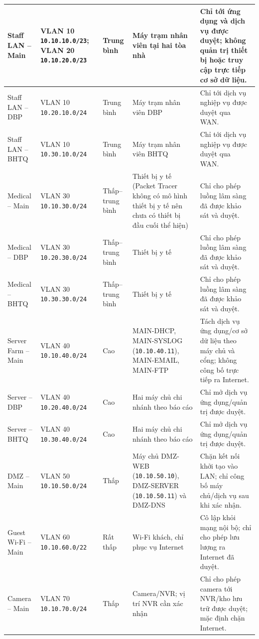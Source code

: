 \begin{small}
\begin{longtable}{|p{2.2cm}|p{3.8cm}|p{1.5cm}|p{3.4cm}|p{3.3cm}|}
Staff LAN -- Main & VLAN 10 \texttt{10.10.10.0/23}; VLAN 20 \texttt{10.10.20.0/23} & Trung bình & Máy trạm nhân viên tại hai tòa nhà & Chỉ tới ứng dụng và dịch vụ được duyệt; không quản trị thiết bị hoặc truy cập trực tiếp cơ sở dữ liệu. \\ \hline
Staff LAN -- DBP & VLAN 10 \texttt{10.20.10.0/24} & Trung bình & Máy trạm nhân viên DBP & Chỉ tới dịch vụ nghiệp vụ được duyệt qua WAN. \\ \hline
Staff LAN -- BHTQ & VLAN 10 \texttt{10.30.10.0/24} & Trung bình & Máy trạm nhân viên BHTQ & Chỉ tới dịch vụ nghiệp vụ được duyệt qua WAN. \\ \hline
Medical -- Main & VLAN 30 \texttt{10.10.30.0/24} & Thấp--trung bình & Thiết bị y tế (Packet Tracer không có mô hình thiết bị y tế nên chưa có thiết bị đầu cuối thể hiện) & Chỉ cho phép luồng lâm sàng đã được khảo sát và duyệt. \\ \hline
Medical -- DBP & VLAN 30 \texttt{10.20.30.0/24} & Thấp--trung bình & Thiết bị y tế & Chỉ cho phép luồng lâm sàng đã được khảo sát và duyệt. \\ \hline
Medical -- BHTQ & VLAN 30 \texttt{10.30.30.0/24} & Thấp--trung bình & Thiết bị y tế & Chỉ cho phép luồng lâm sàng đã được khảo sát và duyệt. \\ \hline
Server Farm -- Main & VLAN 40 \texttt{10.10.40.0/24} & Cao & MAIN-DHCP, MAIN-SYSLOG (\texttt{10.10.40.11}), MAIN-EMAIL, MAIN-FTP & Tách dịch vụ ứng dụng/cơ sở dữ liệu theo máy chủ và cổng; không công bố trực tiếp ra Internet. \\ \hline
Server -- DBP & VLAN 40 \texttt{10.20.40.0/24} & Cao & Hai máy chủ chi nhánh theo báo cáo & Chỉ mở dịch vụ ứng dụng/quản trị được duyệt. \\ \hline
Server -- BHTQ & VLAN 40 \texttt{10.30.40.0/24} & Cao & Hai máy chủ chi nhánh theo báo cáo & Chỉ mở dịch vụ ứng dụng/quản trị được duyệt. \\ \hline
DMZ -- Main & VLAN 50 \texttt{10.10.50.0/24} & Thấp & Máy chủ DMZ-WEB (\texttt{10.10.50.10}), DMZ-SERVER (\texttt{10.10.50.11}) và DMZ-DNS & Chặn kết nối khởi tạo vào LAN; chỉ công bố máy chủ/dịch vụ sau khi xác nhận. \\ \hline
Guest Wi-Fi -- Main & VLAN 60 \texttt{10.10.60.0/22} & Rất thấp & Wi-Fi khách, chỉ phục vụ Internet & Cô lập khỏi mạng nội bộ; chỉ cho phép lưu lượng ra Internet đã duyệt. \\ \hline
Camera -- Main & VLAN 70 \texttt{10.10.70.0/24} & Thấp & Camera/NVR; vị trí NVR cần xác nhận & Chỉ cho phép camera tới NVR/kho lưu trữ được duyệt; mặc định chặn Internet. \\ \hline

\end{longtable}
\end{small}
